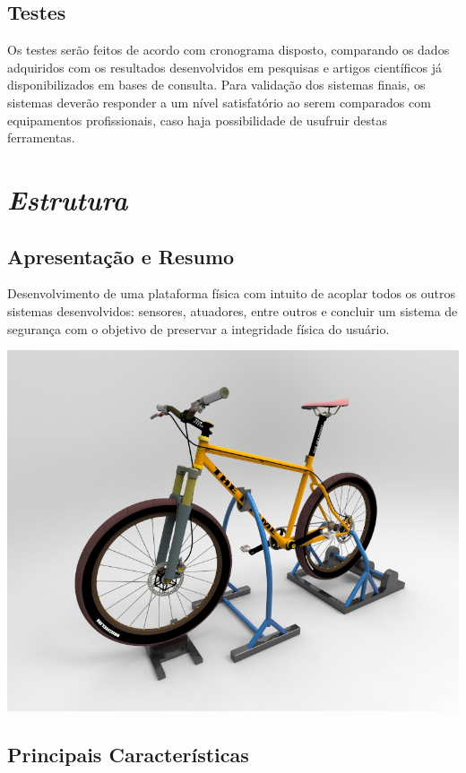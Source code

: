 \subsection{Testes}
Os testes serão feitos de acordo com cronograma disposto, comparando os dados adquiridos com os resultados desenvolvidos em pesquisas e artigos científicos já disponibilizados em bases de consulta. Para validação dos sistemas finais, os sistemas deverão responder a um nível satisfatório ao serem comparados com equipamentos profissionais, caso haja possibilidade de usufruir destas ferramentas.

\section{\textit{Estrutura}}

\subsection{Apresentação e Resumo}
Desenvolvimento de uma plataforma física com intuito de acoplar todos os outros sistemas desenvolvidos: sensores, atuadores, entre outros e concluir um sistema de segurança com o objetivo de preservar a integridade física do usuário.

\begin{center}
\includegraphics[scale=0.4]{figuras/bike_1}
\end{center} 

\subsection{Principais Características}
